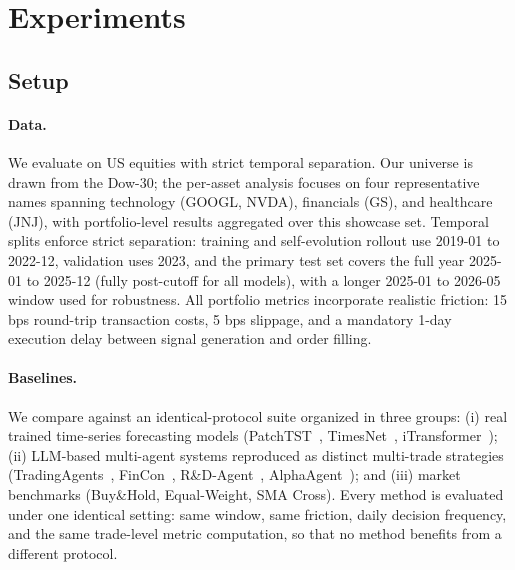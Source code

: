 \section{Experiments}
\label{sec:experiments}

\subsection{Setup}

\paragraph{Data.} We evaluate on US equities with strict temporal separation. Our universe is drawn from the Dow-30; the per-asset analysis focuses on four representative names spanning technology (GOOGL, NVDA), financials (GS), and healthcare (JNJ), with portfolio-level results aggregated over this showcase set. Temporal splits enforce strict separation: training and self-evolution rollout use 2019-01 to 2022-12, validation uses 2023, and the primary test set covers the full year 2025-01 to 2025-12 (fully post-cutoff for all models), with a longer 2025-01 to 2026-05 window used for robustness. All portfolio metrics incorporate realistic friction: 15 bps round-trip transaction costs, 5 bps slippage, and a mandatory 1-day execution delay between signal generation and order filling.

\paragraph{Baselines.} We compare against an identical-protocol suite organized in three groups: (i) real trained time-series forecasting models (PatchTST~\cite{patchtst2023}, TimesNet~\cite{timesnet2023}, iTransformer~\cite{itransformer2024}); (ii) LLM-based multi-agent systems reproduced as distinct multi-trade strategies (TradingAgents~\cite{tradingagents2025}, FinCon~\cite{fincon2024}, R\&D-Agent~\cite{rdagent2025}, AlphaAgent~\cite{alphaagent2025}); and (iii) market benchmarks (Buy\&Hold, Equal-Weight, SMA Cross). Every method is evaluated under one identical setting: same window, same friction, daily decision frequency, and the same trade-level metric computation, so that no method benefits from a different protocol.

